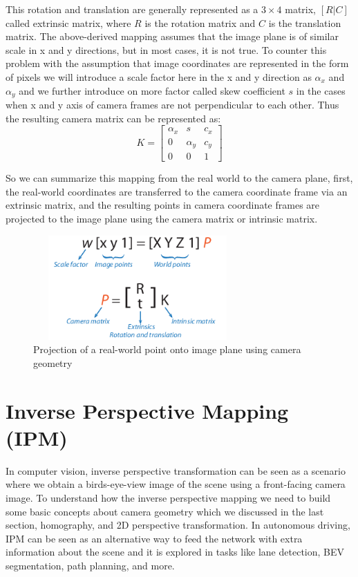     This rotation and translation are generally represented as a $3 \times 4$ matrix, $[R | C ]$ called extrinsic matrix, where $R$ is the rotation matrix and $C$ is the translation matrix. The above-derived mapping assumes that the image plane is of similar scale in x and y directions, but in most cases, it is not true. To counter this problem with the assumption that image coordinates are represented in the form of pixels we will introduce a scale factor here in the x and y direction as $\alpha_{x}$ and $\alpha_{y}$ and we further introduce on more factor called skew coefficient $s$ in the cases when x and y axis of camera frames are not perpendicular to each other. Thus the resulting camera matrix can be represented as:
        \begin{equation}
K =  \begin{bmatrix} \alpha_{x} & s &c_{x} \\  0 & \alpha_{y} & c_{y}  \\  0  &0 &1 \end{bmatrix}
    \end{equation}
    
    So we can summarize this mapping from the real world to the camera plane, first, the real-world coordinates are transferred to the camera coordinate frame via an extrinsic matrix, and the resulting points in camera coordinate frames are projected to the image plane using the camera matrix or intrinsic matrix. 
        \begin{figure}[h]
    \centering
    \includegraphics[width=8cm, height =4cm]{images/extrinsic_intrinsic.png}
    \caption{ Projection of a real-world point onto image plane using camera geometry \cite{10.5555/861369}}
    \end{figure}
    
   
   
    \section{Inverse Perspective Mapping (IPM)}
     In computer vision, inverse perspective transformation can be seen as a scenario where we obtain a birds-eye-view image of the scene using a front-facing camera image. To understand how the inverse perspective mapping we need to build some basic concepts about camera geometry which we discussed in the last section, homography, and 2D perspective transformation. In autonomous driving, IPM can be seen as an alternative way to feed the network with extra information about the scene and it is explored in tasks like lane detection, BEV segmentation, path planning, and more. 
     
